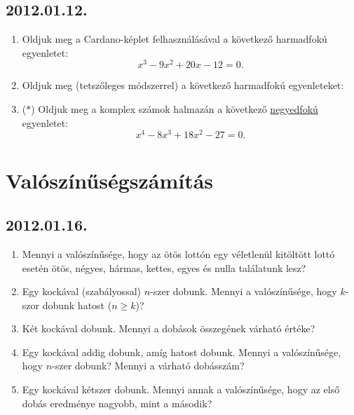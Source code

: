 \subsection*{2012.01.12.}
\begin{enumerate}
\item Oldjuk meg a Cardano-képlet felhasználásával a következő harmadfokú egyenletet:
$$x^3-9x^2+20x-12=0.$$
\item Oldjuk meg (tetszőleges módszerrel) a következő harmadfokú egyenleteket:
\item ($*$) Oldjuk meg a komplex számok halmazán a következő \underline{negyedfokú} egyenletet:
$$x^4-8x^3+18x^2-27=0.$$
\end{enumerate}



\section{Valószínűségszámítás}

\subsection*{2012.01.16.}
\begin{enumerate}
\item
Mennyi a valószínűsége, hogy az ötös lottón egy véletlenül kitöltött lottó esetén ötös, négyes, hármas, kettes, egyes és nulla találatunk lesz?
\item
Egy kockával (szabályossal) $n$-szer dobunk. Mennyi a valószínűsége, hogy $k$-szor dobunk hatost ($n\ge k$)? 
\item
Két kockával dobunk. Mennyi a dobások összegének várható értéke?
\item
Egy kockával addig dobunk, amíg hatost dobunk. Mennyi a valószínűsége, hogy $n$-szer dobunk? Mennyi a várható dobásszám?
\item
Egy kockával kétszer dobunk. Mennyi annak a valószínűsége, hogy az első dobás eredménye nagyobb, mint a második?
\end{enumerate}

